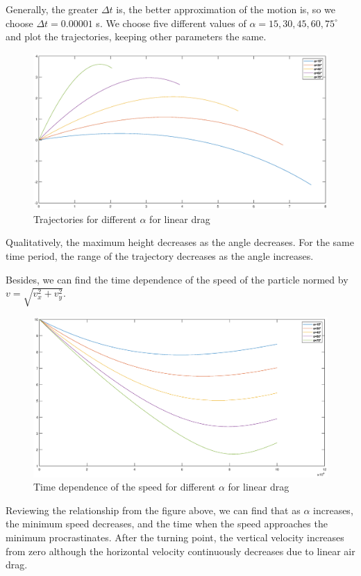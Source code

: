 \documentclass[12pt]{report}
\begin{document}
Generally, the greater $\Delta t$ is, the better approximation of the motion is, so we choose $\Delta t=0.00001$ s. We choose five different values of $\alpha=15,30,45,60,75^\circ$ and plot the trajectories, keeping other parameters the same.
\begin{figure}[H]
    \centering
    \includegraphics[width=1\linewidth]{2-1-3.eps}
    \caption{Trajectories for different $\alpha$ for linear drag}
\end{figure}

Qualitatively, the maximum height decreases as the angle decreases. For the same time period, the range of the trajectory decreases as the angle increases.

Besides, we can find the time dependence of the speed of the particle normed by $v=\sqrt{v_x^2+v_y^2}$.
\begin{figure}[H]
    \centering
    \includegraphics[width=1\linewidth]{2-1-4.eps}
    \caption{Time dependence of the speed for different $\alpha$ for linear drag}
\end{figure}

Reviewing the relationship from the figure above, we can find that as $\alpha$ increases, the minimum speed decreases, and the time when the speed approaches the minimum procrastinates. After the turning point, the vertical velocity increases from zero although the horizontal velocity continuously decreases due to linear air drag.
\end{document}
